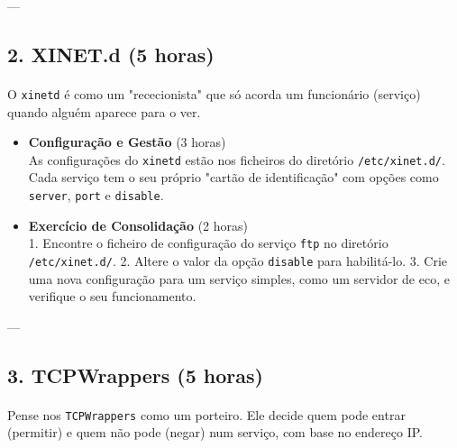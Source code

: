 \documentclass[10pt,a4paper]{article}
\begin{document}
	---
	
	\subsection*{2. XINET.d (5 horas)}
	\vspace{-1.2em}
	\paragraph{}
	O \texttt{xinetd} é como um "rececionista" que só acorda um funcionário (serviço) quando alguém aparece para o ver.
	
	\begin{itemize}
		\item \textbf{Configuração e Gestão} (3 horas) \\
		As configurações do \texttt{xinetd} estão nos ficheiros do diretório \texttt{/etc/xinet.d/}. Cada serviço tem o seu próprio "cartão de identificação" com opções como \texttt{server}, \texttt{port} e \texttt{disable}.
		
		\item \textbf{Exercício de Consolidação} (2 horas) \\
		1. Encontre o ficheiro de configuração do serviço \texttt{ftp} no diretório \texttt{/etc/xinet.d/}.
		2. Altere o valor da opção \texttt{disable} para habilitá-lo.
		3. Crie uma nova configuração para um serviço simples, como um servidor de eco, e verifique o seu funcionamento.
	\end{itemize}
	
	---
	
	\subsection*{3. TCPWrappers (5 horas)}
	\vspace{-1.2em}
	\paragraph{}
	Pense nos \texttt{TCPWrappers} como um porteiro. Ele decide quem pode entrar (permitir) e quem não pode (negar) num serviço, com base no endereço IP.
	
\end{document}
